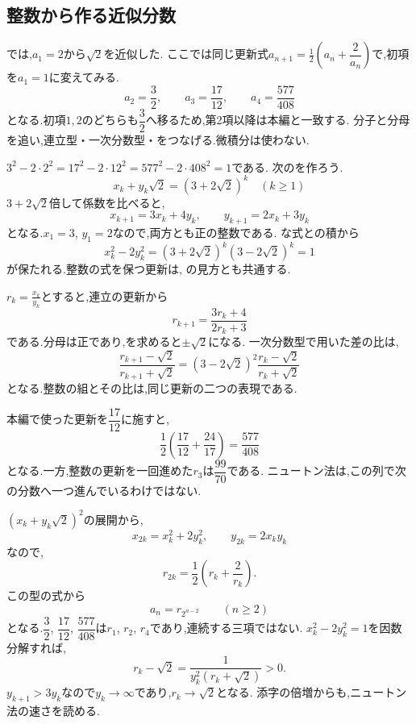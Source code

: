 \subsection{整数から作る近似分数}\label{節：ペル方程式と近似分数}
  では,$a_1=2$から$\sqrt2$を近似した.
  ここでは同じ更新式$a_{n+1}=\frac12\left(a_n+\dfrac{2}{a_n}\right)$で,初項を$a_1=1$に変えてみる.
  \[
    a_2=\frac32,\qquad a_3=\frac{17}{12},\qquad a_4=\frac{577}{408}
  \]
  となる.初項$1,2$のどちらも$\dfrac{3}{2}$へ移るため,第2項以降は本編と一致する.
  分子と分母を追い,連立型・一次分数型・をつなげる.微積分は使わない.

  $3^2-2\cdot2^2=17^2-2\cdot12^2=577^2-2\cdot408^2=1$である.
  次のを作ろう.
  \[
    x_k+y_k\sqrt2=(3+2\sqrt2)^k\quad(k\ge1)
  \]
  $3+2\sqrt2$倍して係数を比べると,
  \[
    x_{k+1}=3x_k+4y_k,\qquad y_{k+1}=2x_k+3y_k
  \]
  となる.$x_1=3$, $y_1=2$なので,両方とも正の整数である.
  な式との積から
  \[
    x_k^2-2y_k^2=(3+2\sqrt2)^k(3-2\sqrt2)^k=1
  \]
  が保たれる.整数の式を保つ更新は,
  の見方とも共通する.

  $r_k=\frac{x_k}{y_k}$とすると,連立の更新から
  \[
    r_{k+1}=\frac{3r_k+4}{2r_k+3}
  \]
  である.分母は正であり,を求めると$\pm\sqrt2$になる.
  一次分数型で用いた差の比は,
  \[
    \frac{r_{k+1}-\sqrt2}{r_{k+1}+\sqrt2}
    =(3-2\sqrt2)^2
      \frac{r_k-\sqrt2}{r_k+\sqrt2}
  \]
  となる.整数の組とその比は,同じ更新の二つの表現である.

  本編で使った更新を$\dfrac{17}{12}$に施すと,
  \[
    \frac12\left(\frac{17}{12}+\frac{24}{17}\right)=\frac{577}{408}
  \]
  となる.一方,整数の更新を一回進めた$r_3$は$\dfrac{99}{70}$である.
  ニュートン法は,この列で次の分数へ一つ進んでいるわけではない.

  $(x_k+y_k\sqrt2)^2$の展開から,
  \[
    x_{2k}=x_k^2+2y_k^2,\qquad y_{2k}=2x_ky_k
  \]
  なので,
  \[
    r_{2k}=\frac12\left(r_k+\frac2{r_k}\right).
  \]
  この型の式から
  \[
    a_n=r_{2^{n-2}}\qquad(n\ge2)
  \]
  となる.$\dfrac{3}{2}$, $\dfrac{17}{12}$, $\dfrac{577}{408}$は$r_1$, $r_2$, $r_4$であり,連続する三項ではない.
  \BookFigPellDoubling
  $x_k^2-2y_k^2=1$を因数分解すれば,
  \[
    r_k-\sqrt2=\frac1{y_k^2(r_k+\sqrt2)}>0.
  \]
  $y_{k+1}>3y_k$なので$y_k\to\infty$であり,$r_k\to\sqrt2$となる.
  添字の倍増からも,ニュートン法の速さを読める.

